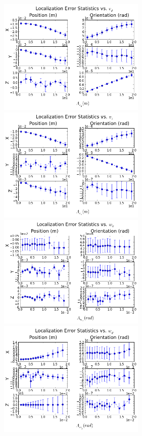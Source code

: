 \begin{figure}[h]
  \centering
  \includegraphics[width=7cm, keepaspectratio=true]{./Figures/SimulationFigures/Figure9.png}
  \includegraphics[width=7cm, keepaspectratio=true]{./Figures/SimulationFigures/Figure10.png}
  \includegraphics[width=7cm, keepaspectratio=true]{./Figures/SimulationFigures/Figure11.png}
  \includegraphics[width=7cm, keepaspectratio=true]{./Figures/SimulationFigures/Figure12.png}

\end{figure}
